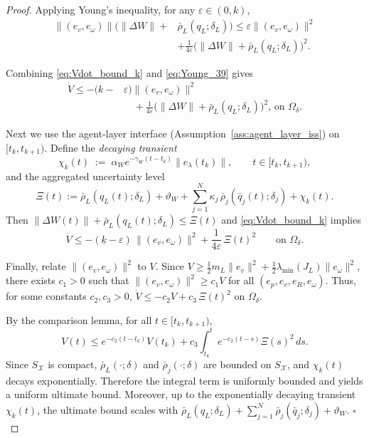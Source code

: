 \documentclass[letterpaper, 10 pt, conference]{ieeeconf}  %
\newcommand{\0}{\matr{0}}
\begin{document}
\begin{proof}
Applying Young's inequality, for any $\varepsilon\in(0,k)$,
\begin{equation}
\label{eq:Young_39}
\begin{aligned}
\|(e_v,e_\omega)\|\Big(\|\Delta W\|+&\bar\rho_L(q_L;\delta_L)\Big)
\le \varepsilon\|(e_v,e_\omega)\|^2\\
&+\frac{1}{4\varepsilon}
\Big(\|\Delta W\|+\bar\rho_L(q_L;\delta_L)\Big)^2.
\end{aligned}
\end{equation}

Combining \eqref{eq:Vdot_bound_k} and \eqref{eq:Young_39} gives
\begin{equation}
\label{eq:Vdot_bound_40}
\begin{aligned}
\dot V
\le -(k-&\varepsilon)\|(e_v,e_\omega)\|^2\\
&\quad+\frac{1}{4\varepsilon}
\Big(\|\Delta W\|+\bar\rho_L(q_L;\delta_L)\Big)^2,
\, \text{on }\Omega_\delta .
\end{aligned}
\end{equation}


Next we use the agent-layer interface (Assumption~\ref{ass:agent_layer_iss}) on $[t_k,t_{k+1})$. Define the \emph{decaying transient}
\[
\chi_k(t)\;:=\;\alpha_W e^{-\gamma_W(t-t_k)}\|e_\lambda(t_k)\|,\qquad t\in[t_k,t_{k+1}),
\]
and the aggregated uncertainty level
\[
\Xi(t) := \bar\rho_L(q_L(t);\delta_L) + \vartheta_W +
\sum_{j=1}^N \kappa_j\,\bar\rho_j(\bar q_j(t);\delta_j) + \chi_k(t).\]
Then $\|\Delta W(t)\|+\bar\rho_L(q_L(t);\delta_L)\le \Xi(t)$ and \eqref{eq:Vdot_bound_k} implies
\begin{equation}
\dot V
\le
-(\underline{k}-\varepsilon)\,\|(e_v,e_\omega)\|^2
+\frac{1}{4\varepsilon}\,\Xi(t)^2
\qquad\text{on } \Omega_\delta.
\label{eq:Vdot_step3}
\end{equation}

Finally, relate $\|(e_v,e_\omega)\|^2$ to $V$. Since $V\ge \tfrac12 m_L\|e_v\|^2+\tfrac12\lambda_{\min}(J_L)\|e_\omega\|^2$,
there exists $c_1>0$ such that $\|(e_v,e_\omega)\|^2\ge c_1 V$ for all $(e_p,e_v,e_R,e_\omega)$.
Thus, for some constants $c_2,c_3>0$, $\dot V \le -c_2 V + c_3\,\Xi(t)^2$ on $\Omega_\delta$.

By the comparison lemma, for all $t\in[t_k,t_{k+1})$,
\[
V(t)\le e^{-c_2(t-t_k)}V(t_k)+c_3\int_{t_k}^{t} e^{-c_2(t-s)}\Xi(s)^2\,ds.
\]
Since $S_{\mathcal X}$ is compact, $\bar\rho_L(\cdot;\delta)$ and $\bar\rho_j(\cdot;\delta)$ are bounded on $S_{\mathcal X}$,
and $\chi_k(t)$ decays exponentially. Therefore the integral term is uniformly bounded and yields a uniform ultimate bound.
Moreover, up to the exponentially decaying transient $\chi_k(t)$, the ultimate bound scales with
$\bar\rho_L(q_L;\delta_L)+\sum_{j=1}^N\bar\rho_j(\bar q_j;\delta_j)+\vartheta_W$. \hfill$\square$
\end{proof}
\end{document}
